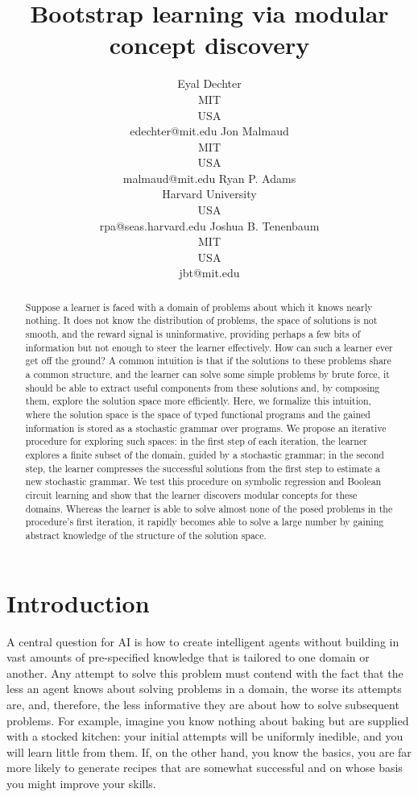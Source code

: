 \documentclass{article}
\title{Bootstrap learning via modular concept discovery}
\author{Eyal Dechter \\
MIT\\
USA \\
edechter@mit.edu
\And
Jon Malmaud \\
MIT \\ 
USA \\
malmaud@mit.edu
\And 
Ryan P.  Adams \\
Harvard University\\
USA \\
rpa@seas.harvard.edu
\And
Joshua B. Tenenbaum \\
MIT\\
USA \\
jbt@mit.edu
}
\begin{document}
\maketitle
\begin{abstract}
 Suppose a learner is faced with a domain of problems about which it
 knows nearly nothing. It does not know the distribution of problems,
 the space of solutions is not smooth, and the reward signal is
 uninformative, providing perhaps a few bits of information but not
 enough to steer the learner effectively. How can such a learner ever
 get off the ground? A common intuition is that if the solutions to
 these problems share a common structure, and the learner can solve
 some simple problems by brute force, it should be able to extract
 useful components from these solutions and, by composing them,
 explore the solution space more efficiently. Here, we formalize this
 intuition, where the solution space is the space of typed functional
 programs and the gained information is stored as a stochastic grammar
 over programs. We propose an iterative procedure for exploring such
 spaces: in the first step of each iteration, the learner explores a
 finite subset of the domain, guided by a stochastic grammar; in the
 second step, the learner compresses the successful solutions from the
 first step to estimate a new stochastic grammar. We test this
 procedure on symbolic regression and Boolean circuit learning and
 show that the learner discovers modular concepts for these
 domains. Whereas the learner is able to solve almost none of the
 posed problems in the procedure's first iteration, it rapidly becomes
 able to solve a large number by gaining abstract knowledge of the
 structure of the solution space.
 
 
\end{abstract}

\section{Introduction}
A central question for AI is how to create intelligent agents without
building in vast amounts of pre-specified knowledge that is tailored
to one domain or another. Any attempt to solve this problem must
contend with the fact that the less an agent knows about solving
problems in a domain, the worse its attempts are, and, therefore, the
less informative they are about how to solve subsequent problems. For
example, imagine you know nothing about baking but are supplied with a
stocked kitchen: your initial attempts will be uniformly inedible, and
you will learn little from them. If, on the other hand, you know the
basics, you are far more likely to generate recipes that are
somewhat successful and on whose basis you might improve your skills.
\end{document}
